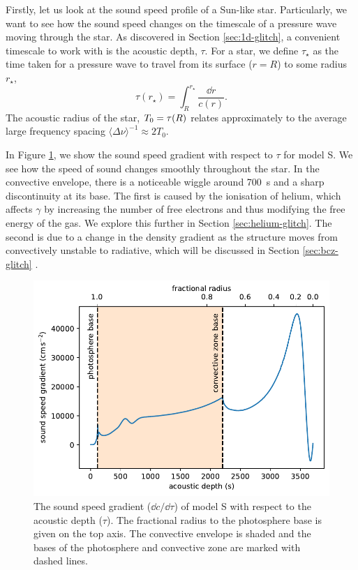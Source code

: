 Firstly, let us look at the sound speed profile of a Sun-like star. Particularly, we want to see how the sound speed changes on the timescale of a pressure wave moving through the star. As discovered in Section \ref{sec:1d-glitch}, a convenient timescale to work with is the acoustic depth, \(\tau\). For a star, we define \(\tau_\star\) as the time taken for a pressure wave to travel from its surface (\(r=R\)) to some radius \(r_\star\),
%
\begin{equation}
    \tau(r_\star) = \int_R^{r_\star} \frac{\dd r}{c(r)}.
\end{equation}
%
The acoustic radius of the star, \({T_0} = \tau(R)\) relates approximately to the average large frequency spacing \(\langle\Delta\nu\rangle^{-1} \approx 2T_0\).

In Figure \ref{fig:sound-speed-gradient}, we show the sound speed gradient with respect to \(\tau\) for model S. We see how the speed of sound changes smoothly throughout the star. In the convective envelope, there is a noticeable wiggle around \SI{700}{\second} and a sharp discontinuity at its base. The first is caused by the ionisation of helium, which affects \(\gamma\) by increasing the number of free electrons and thus modifying the free energy of the gas. We explore this further in Section \ref{sec:helium-glitch}. The second is due to a change in the density gradient as the structure moves from convectively unstable to radiative, which will be discussed in Section \ref{sec:bcz-glitch} .

\begin{figure}
    \centering
    \includegraphics{figures/sound-speed-gradient.pdf}
    \caption{The sound speed gradient (\(\dd c/\dd \tau\)) of model S with respect to the acoustic depth (\(\tau\)). The fractional radius to the photosphere base is given on the top axis. The convective envelope is shaded and the bases of the photosphere and convective zone are marked with dashed lines.}
    \label{fig:sound-speed-gradient}
\end{figure}

